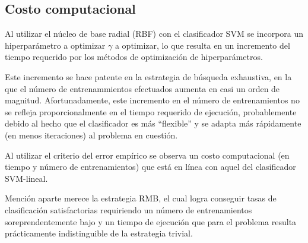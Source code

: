 \subsection{Costo computacional}
Al utilizar el núcleo de base radial (RBF) con el clasificador SVM se
incorpora un hiperparámetro a optimizar $\gamma$ a optimizar, lo que
resulta en un incremento del tiempo requerido por los métodos de
optimización de hiperparámetros.

Este incremento se hace patente en la estrategia de búsqueda
exhaustiva, en la que el número de entrenammientos efectuados aumenta
en casi un orden de magnitud.  Afortunadamente, este incremento en el
número de entrenamientos no se refleja proporcionalmente en el tiempo
requerido de ejecución, probablemente debido al hecho que el
clasificador es más ``flexible'' y se adapta más rápidamente (en menos
iteraciones) al problema en cuestión.

Al utilizar el criterio del error empírico se observa un costo computacional
(en tiempo y número de entrenamientos) que está en línea con
aquel del clasificador SVM-lineal.

Mención aparte merece la estrategia RMB, el cual logra conseguir tasas
de clasificación satisfactorias requiriendo un número de
entrenamientos soreprendentemente bajo y un tiempo de ejecución que
para el problema \tripletsvm{} resulta prácticamente indistinguible de
la estrategia trivial.